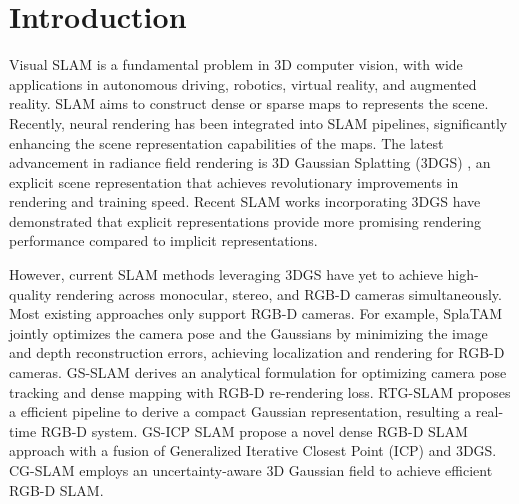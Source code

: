 \section{Introduction}
\label{sec:intro}
Visual SLAM is a fundamental problem in 3D computer vision, with wide applications in autonomous driving, robotics, virtual reality, and augmented reality. SLAM aims to construct dense or sparse maps to represents the scene. Recently, neural rendering \cite{NeRF2020} has been integrated into SLAM pipelines, significantly enhancing the scene representation capabilities of the maps. The latest advancement in radiance field rendering is 3D Gaussian Splatting (3DGS) \cite{3DGS2023}, an explicit scene representation that achieves revolutionary improvements in rendering and training speed. Recent SLAM works \cite{Photo-SLAM2024, MonoGS2024, SplaTAM2024, GS-SLAM2024, RTG-SLAM2024, CG-SLAM2024, GS-ICPSLAM2024} incorporating 3DGS have demonstrated that explicit representations provide more promising rendering performance compared to implicit representations.


However, current SLAM methods leveraging 3DGS have yet to achieve high-quality rendering across monocular, stereo, and RGB-D cameras simultaneously. Most existing approaches only support RGB-D cameras. For example, SplaTAM \cite{SplaTAM2024} jointly optimizes the camera pose and the Gaussians by minimizing the image and depth reconstruction errors, achieving localization and rendering for RGB-D cameras. GS-SLAM \cite{GS-SLAM2024} derives an analytical formulation for optimizing camera pose tracking and dense mapping with RGB-D re-rendering loss. RTG-SLAM \cite{RTG-SLAM2024} proposes a efficient pipeline to derive a compact Gaussian representation, resulting a real-time RGB-D system. GS-ICP SLAM \cite{GS-ICPSLAM2024} propose a novel dense RGB-D SLAM approach with a fusion of Generalized Iterative Closest Point (ICP) and 3DGS. CG-SLAM \cite{CG-SLAM2024} employs an uncertainty-aware 3D Gaussian field to achieve efficient RGB-D SLAM. 

